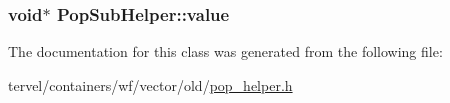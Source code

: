 \subsubsection[{value}]{\setlength{\rightskip}{0pt plus 5cm}void$\ast$ Pop\+Sub\+Helper\+::value}\label{class_pop_sub_helper_aed4ed06407d4fde68304918e1b9f0dcd}


The documentation for this class was generated from the following file\+:\begin{DoxyCompactItemize}
\item 
tervel/containers/wf/vector/old/\hyperlink{pop__helper_8h}{pop\+\_\+helper.\+h}\end{DoxyCompactItemize}
